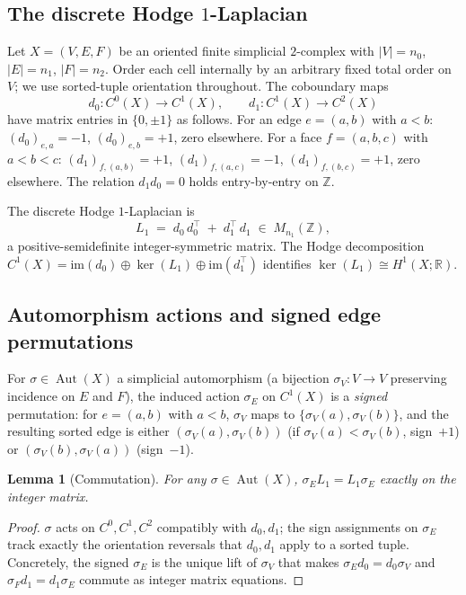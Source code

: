 \documentclass[12pt,a4paper]{article}
\newtheorem{lemma}[theorem]{Lemma}
\theoremstyle{definition}
\theoremstyle{remark}
\newcommand{\bZ}{\mathbb{Z}}
\newcommand{\bR}{\mathbb{R}}
\DeclareMathOperator{\Aut}{Aut}
\begin{document}
\subsection{The discrete Hodge $1$-Laplacian}\label{sec:dh-bg-L1}

Let $X = (V, E, F)$ be an oriented finite simplicial $2$-complex with
$|V| = n_0$, $|E| = n_1$, $|F| = n_2$. Order each cell internally by an
arbitrary fixed total order on $V$; we use sorted-tuple orientation
throughout. The coboundary maps
\begin{equation}
  d_0\colon C^0(X) \to C^1(X), \qquad
  d_1\colon C^1(X) \to C^2(X)
\end{equation}
have matrix entries in $\{0, \pm 1\}$ as follows. For an edge $e = (a, b)$
with $a < b$: $(d_0)_{e, a} = -1$, $(d_0)_{e, b} = +1$, zero elsewhere.
For a face $f = (a, b, c)$ with $a < b < c$: $(d_1)_{f, (a,b)} = +1$,
$(d_1)_{f, (a,c)} = -1$, $(d_1)_{f, (b,c)} = +1$, zero elsewhere. The
relation $d_1 d_0 = 0$ holds entry-by-entry on $\bZ$.

The discrete Hodge $1$-Laplacian is
\begin{equation}\label{eq:L1-defn}
  L_1 \;=\; d_0\,d_0^\top \;+\; d_1^\top\,d_1
  \;\in\; M_{n_1}(\bZ),
\end{equation}
a positive-semidefinite integer-symmetric matrix. The Hodge decomposition
$C^1(X) = \mathrm{im}(d_0) \oplus \ker(L_1) \oplus \mathrm{im}(d_1^\top)$
identifies $\ker(L_1) \cong H^1(X; \bR)$.

\subsection{Automorphism actions and signed edge permutations}\label{sec:dh-bg-sigmaE}

For $\sigma \in \Aut(X)$ a simplicial automorphism (a bijection
$\sigma_V\colon V \to V$ preserving incidence on $E$ and $F$), the
induced action $\sigma_E$ on $C^1(X)$ is a \emph{signed} permutation: for
$e = (a, b)$ with $a < b$, $\sigma_V$ maps to $\{\sigma_V(a), \sigma_V(b)\}$,
and the resulting sorted edge is either $(\sigma_V(a), \sigma_V(b))$
(if $\sigma_V(a) < \sigma_V(b)$, sign~$+1$) or
$(\sigma_V(b), \sigma_V(a))$ (sign~$-1$).

\begin{lemma}[Commutation]\label{lem:commute}
For any $\sigma \in \Aut(X)$, $\sigma_E L_1 = L_1 \sigma_E$ exactly on the
integer matrix.
\end{lemma}

\begin{proof}
$\sigma$ acts on $C^0, C^1, C^2$ compatibly with $d_0, d_1$; the
sign assignments on $\sigma_E$ track exactly the orientation reversals
that $d_0, d_1$ apply to a sorted tuple. Concretely, the signed
$\sigma_E$ is the unique lift of $\sigma_V$ that makes $\sigma_E d_0 =
d_0 \sigma_V$ and $\sigma_F d_1 = d_1 \sigma_E$ commute as integer
matrix equations.
\end{proof}
\end{document}

